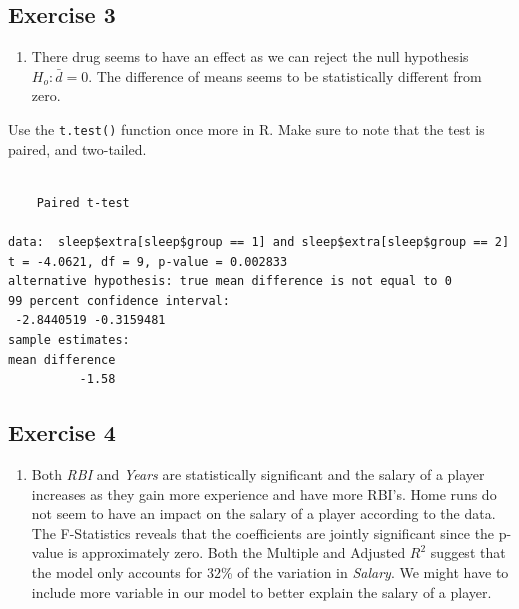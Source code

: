 \documentclass[
  letterpaper,
  DIV=11,
  numbers=noendperiod]{scrreprt}
\newenvironment{Shaded}{\begin{snugshade}}{\end{snugshade}}
\newcommand{\AttributeTok}[1]{\textcolor[rgb]{0.40,0.45,0.13}{#1}}
\newcommand{\DecValTok}[1]{\textcolor[rgb]{0.68,0.00,0.00}{#1}}
\newcommand{\FloatTok}[1]{\textcolor[rgb]{0.68,0.00,0.00}{#1}}
\newcommand{\FunctionTok}[1]{\textcolor[rgb]{0.28,0.35,0.67}{#1}}
\newcommand{\NormalTok}[1]{\textcolor[rgb]{0.00,0.23,0.31}{#1}}
\newcommand{\SpecialCharTok}[1]{\textcolor[rgb]{0.37,0.37,0.37}{#1}}
\newcommand{\StringTok}[1]{\textcolor[rgb]{0.13,0.47,0.30}{#1}}
\providecommand{\tightlist}{%
  \setlength{\itemsep}{0pt}\setlength{\parskip}{0pt}}\usepackage{longtable,booktabs,array}
\begin{document}
\hypertarget{exercise-3-27}{%
\subsection*{Exercise 3}\label{exercise-3-27}}

\begin{enumerate}
\def\labelenumi{\arabic{enumi}.}
\tightlist
\item
  There drug seems to have an effect as we can reject the null
  hypothesis \(H_{o}:\bar {d} = 0\). The difference of means seems to be
  statistically different from zero.
\end{enumerate}

Use the \texttt{t.test()} function once more in R. Make sure to note
that the test is paired, and two-tailed.

\begin{Shaded}
\end{Shaded}

\begin{verbatim}

    Paired t-test

data:  sleep$extra[sleep$group == 1] and sleep$extra[sleep$group == 2]
t = -4.0621, df = 9, p-value = 0.002833
alternative hypothesis: true mean difference is not equal to 0
99 percent confidence interval:
 -2.8440519 -0.3159481
sample estimates:
mean difference 
          -1.58 
\end{verbatim}

\hypertarget{exercise-4-17}{%
\subsection*{Exercise 4}\label{exercise-4-17}}

\begin{enumerate}
\def\labelenumi{\arabic{enumi}.}
\tightlist
\item
  Both \emph{RBI} and \emph{Years} are statistically significant and the
  salary of a player increases as they gain more experience and have
  more RBI's. Home runs do not seem to have an impact on the salary of a
  player according to the data. The F-Statistics reveals that the
  coefficients are jointly significant since the p-value is
  approximately zero. Both the Multiple and Adjusted \(R^2\) suggest
  that the model only accounts for \(32\)\% of the variation in
  \emph{Salary}. We might have to include more variable in our model to
  better explain the salary of a player.
\end{enumerate}
\end{document}
